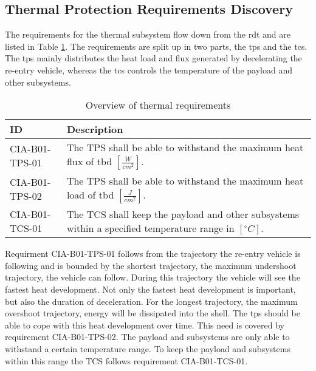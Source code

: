 \subsection{Thermal Protection Requirements Discovery} \label{sec:thermreq}
The requirements for the thermal subsystem flow down from the \gls{rdt} and are listed in Table \ref{tab:thermalreq}. The requirements are split up in two parts, the \gls{tps} and the \gls{tcs}. The \gls{tps} mainly distributes the heat load and flux generated by decelerating the re-entry vehicle, whereas the \gls{tcs} controls the temperature of the payload and other subsystems.


\begin{table}[H]
	\caption{Overview of thermal requirements}
	\begin{tabular}{|p{}|p{}|}
    \hline
    ID          & Description                                                                                                      \\ \hline \hline
    CIA-B01-TPS-01 & The TPS shall be able to withstand the maximum heat flux of \gls{tbd} $ \left[\frac{W}{cm^2}\right] $.               
\\ \hline
    CIA-B01-TPS-02 &  The TPS shall be able to withstand the maximum heat load of \gls{tbd} $ \left[\frac{J}{cm^2}\right] $.                
\\ \hline
    CIA-B01-TCS-01 & The TCS shall keep the payload and other subsystems within a specified temperature range in $\left[^{\circ}C\right]$.                                            
\\ \hline
    \end{tabular}
    \label{tab:thermalreq}
\end{table}

Requirment CIA-B01-TPS-01 follows from the trajectory the re-entry vehicle is following and is bounded by the shortest trajectory, the maximum undershoot trajectory, the vehicle can follow. During this trajectory the vehicle will see the fastest heat development. Not only the fastest heat development is important, but also the duration of deceleration. For the longest trajectory, the maximum overshoot trajectory, energy will be dissipated into the shell. The \gls{tps} should be able to cope with this heat development over time. This need is covered by requirement CIA-B01-TPS-02. The payload and subsystems are only able to withstand a certain temperature range. To keep the payload and subsystems within this range the TCS follows requirement CIA-B01-TCS-01.

